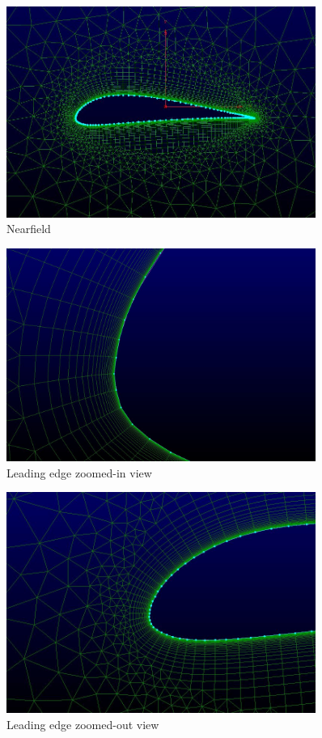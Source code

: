 \begin{figure}[H]
	\centering
	\includegraphics[width=0.9\textwidth]{general_images/nearfield}
	\caption{Nearfield}
\label{fig:nearfield}
\end{figure}	

\begin{figure}[H]
	\centering
	\includegraphics[width=0.9\textwidth]{general_images/LE1}
	\caption{Leading edge zoomed-in view}
\label{fig:LE}
\end{figure}


\begin{figure}[H]
	\centering
	\includegraphics[width=0.9\textwidth]{general_images/LE2}
	\caption{Leading edge zoomed-out view}
\label{fig:LE}
\end{figure}


